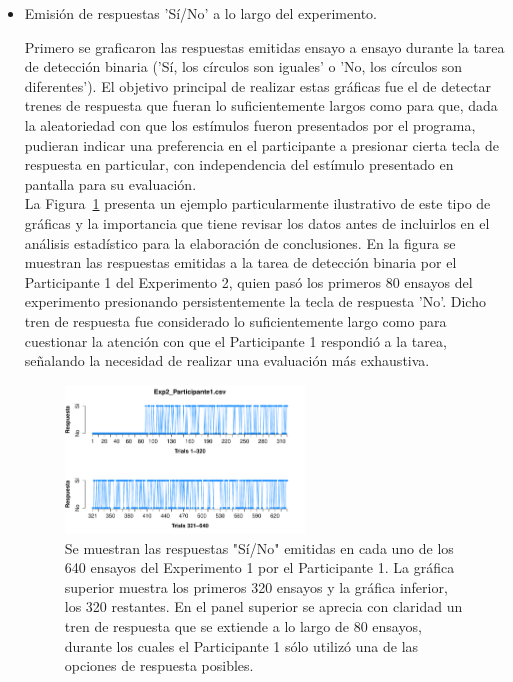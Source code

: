\begin{itemize}
\item Emisión de respuestas 'Sí/No' a lo largo del experimento.

Primero se graficaron las respuestas emitidas ensayo a ensayo durante la tarea de detección binaria ('Sí, los círculos son iguales' o 'No, los círculos son diferentes'). El objetivo principal de realizar estas gráficas fue el de detectar trenes de respuesta que fueran lo suficientemente largos como para que, dada la aleatoriedad con que los estímulos fueron presentados por el programa, pudieran indicar una preferencia en el participante a presionar cierta tecla de respuesta en particular, con independencia del estímulo presentado en pantalla para su evaluación.\\

La Figura~\ref{fig:Resp_E2_P1} presenta un ejemplo particularmente ilustrativo de este tipo de gráficas y la importancia que tiene revisar los datos antes de incluirlos en el análisis estadístico para la elaboración de conclusiones. En la figura se muestran las respuestas emitidas a la tarea de detección binaria por el Participante 1 del Experimento 2, quien pasó los primeros 80 ensayos del experimento presionando persistentemente la tecla de respuesta 'No'. Dicho tren de respuesta fue considerado lo suficientemente largo como para cuestionar la atención con que el Participante 1 respondió a la tarea, señalando la necesidad de realizar una evaluación más exhaustiva.\\ 

\begin{figure}[th]
\centering
\includegraphics[width=0.60\textwidth]{Figures/Response_Exp2_P1} 
\caption[Respuesta emitida por ensayo: Ejemplo de participante sesgado]{Se muestran las respuestas "Sí/No" emitidas en cada uno de los 640 ensayos del Experimento 1 por el Participante 1. La gráfica superior muestra los primeros 320 ensayos y la gráfica inferior, los 320 restantes. En el panel superior se aprecia con claridad un tren de respuesta que se extiende a lo largo de 80 ensayos, durante los cuales el Participante 1 sólo utilizó una de las opciones de respuesta posibles.}
\label{fig:Resp_E2_P1}
\end{figure}


\end{itemize}
